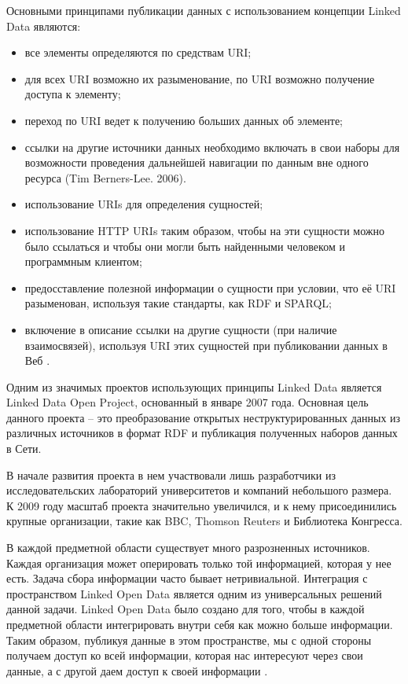 Основными принципами публикации данных с использованием концепции Linked Data являются:

\begin{itemize}
\item все элементы определяются по средствам  URI;
\item для всех URI возможно их разыменование,  по URI возможно получение доступа к элементу;
\item переход по URI ведет к получению больших данных об элементе;
\item ссылки на другие источники данных необходимо включать в свои наборы для возможности проведения дальнейшей навигации по данным вне одного ресурса (Tim Berners-Lee. 2006). 
\end{itemize}

\begin{itemize}
\item использование URIs для определения сущностей;
\item использование HTTP URIs таким образом, чтобы на эти сущности можно было ссылаться и чтобы они могли быть найденными человеком и программным клиентом;
\item предосставление полезной информации о сущности при условии, что её URI разыменован, используя такие стандарты, как RDF и SPARQL;
\item включение в описание ссылки на другие сущности (при наличие взаимосвязей), используя URI этих сущностей при публиковании данных в Веб \cite{bizer2008linked}.
\end{itemize}

Одним из значимых проектов использующих принципы Linked Data является Linked Data Open Project, основанный в январе 2007 года. Основная цель данного проекта – это преобразование открытых неструктурированных данных из различных источников в формат RDF и публикация полученных наборов данных в Сети.

В начале развития проекта в нем участвовали лишь разработчики из исследовательских лабораторий университетов и компаний небольшого размера. К 2009 году масштаб проекта значительно увеличился, и к нему присоединились крупные организации, такие как BBC, Thomson Reuters и Библиотека Конгресса.

В каждой предметной области существует много разрозненных источников. Каждая организация может оперировать только той информацией, которая у нее есть. Задача сбора информации часто бывает нетривиальной. Интеграция с пространством Linked Open Data является одним из универсальных решений данной задачи. Linked Open Data было создано для того, чтобы в каждой предметной области интегрировать внутри себя как можно больше информации. Таким образом, публикуя данные в этом пространстве, мы с одной стороны получаем доступ ко всей информации, которая нас интересуют через свои данные, а с другой даем доступ к своей информации \cite{malakhov2014integration}.

